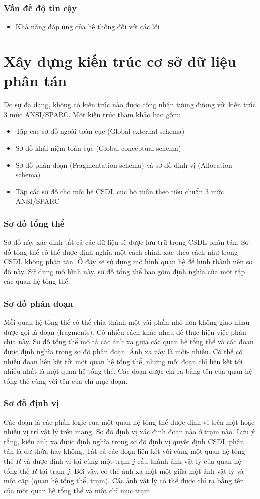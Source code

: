 \documentclass[12pt,a4paper]{report}
\begin{document}
\subsubsection{Vấn đề độ tin cậy}
\begin{itemize}
	\item Khả năng đáp ứng của hệ thống đối với các lỗi
\end{itemize}
\section{Xây dựng kiến trúc cơ sở dữ liệu phân tán}
Do sự đa dạng, không có kiến trúc nào được công nhận tương đương với kiến trúc 3 mức ANSI/SPARC. Một kiến trúc tham khảo bao gồm: 
\begin{itemize}
	\item Tập các sơ đồ ngoài toàn cục (Global external schema)
	\item Sơ đồ khái niệm toàn cục (Global conceptual schema)
	\item Sơ đồ phân đoạn (Fragmentation schema) và sơ đồ định vị (Allocation schema)
	\item Tập các sơ đồ cho mỗi hệ CSDL cục bộ tuân theo tiêu chuẩn 3 mức ANSI/SPARC
\end{itemize} 
\subsubsection{Sơ đồ tổng thể}
Sơ đồ này xác định tất cả các dữ liệu sẽ được lưu trữ trong CSDL phân tán. Sơ đồ tổng thể có thể được định nghĩa một cách chính xác theo cách như trong CSDL không phân tán. Ở đây sẽ sử dụng mô hình quan hệ để hình thành nên sơ đồ này. Sử dụng mô hình này, sơ đồ tổng thể bao gồm định nghĩa của một tập các quan hệ tổng thể. 
\subsubsection{Sơ đồ phân đoạn}
Mỗi quan hệ tổng thể có thể chia thành một vài phần nhỏ hơn không giao nhau được gọi là đoạn (fragments). Có nhiều cách khác nhau để thực hiện việc phân chia này. Sơ đồ tổng thể mô tả các ánh xạ giữa các quan hệ tổng thể và các đoạn được định nghĩa trong sơ đồ phân đoạn. Ánh xạ này là một- nhiều. Có thể có nhiều đoạn liên kết tới một quan hệ tổng thể, nhưng mỗi đoạn chỉ liên kết tới nhiều nhất là một quan hệ tổng thể. Các đoạn được chỉ ra bằng tên của quan hệ tổng thể cùng với tên của chỉ mục đoạn.
\subsubsection{Sơ đồ định vị} 
Các đoạn là các phần logic của một quan hệ tổng thể được định vị trên một hoặc nhiều vị trí vật lý trên mạng. Sơ đồ định vị xác định đoạn nào ở trạm nào. Lưu ý rằng, kiểu ánh xạ được định nghĩa trong sơ đồ định vị quyết định CSDL phân tán là dư thừa hay không. Tất cả các đoạn liên kết với cùng một quan hệ tổng thể $R$ và được định vị tại cùng một trạm $j$ cấu thành ảnh vật lý của quan hệ tổng thể $R$ tại trạm $j$. Bởi vậy, có thể ánh xạ một-một giữa một ảnh vật lý và một cặp (quan hệ tổng thể, trạm). Các ảnh vật lý có thể được chỉ ra bằng tên của một quan hệ tổng thể và một chỉ mục trạm. 
\end{document}
